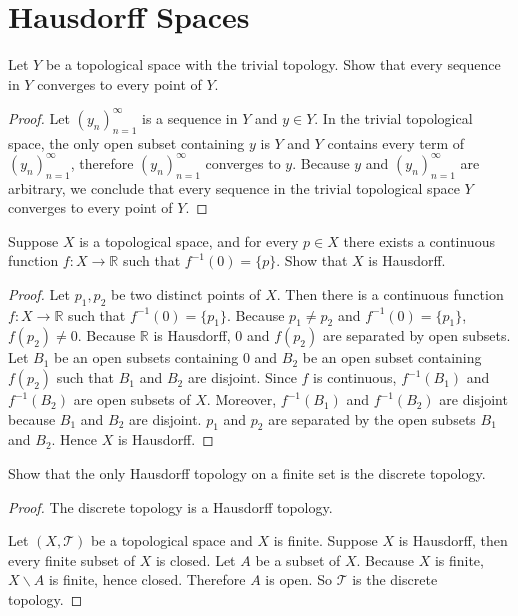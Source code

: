 \section*{Hausdorff Spaces}

\begin{exercise}{2.33}
	Let $Y$ be a topological space with the trivial topology. Show that every sequence in $Y$ converges to every point of $Y$.
\end{exercise}

\begin{proof}
	Let ${(y_{n})}^{\infty}_{n=1}$ is a sequence in $Y$ and $y\in Y$. In the trivial topological space, the only open subset containing $y$ is $Y$ and $Y$ contains every term of ${(y_{n})}^{\infty}_{n=1}$, therefore ${(y_{n})}^{\infty}_{n=1}$ converges to $y$. Because $y$ and ${(y_{n})}^{\infty}_{n=1}$ are arbitrary, we conclude that every sequence in the trivial topological space $Y$ converges to every point of $Y$.
\end{proof}

\begin{exercise}{2.35}
	Suppose $X$ is a topological space, and for every $p\in X$ there exists a continuous function $f: X\to \mathbb{R}$ such that $f^{-1}(0) = \{ p \}$. Show that $X$ is Hausdorff.
\end{exercise}

\begin{proof}
	Let $p_{1}, p_{2}$ be two distinct points of $X$. Then there is a continuous function $f: X\to\mathbb{R}$ such that $f^{-1}(0) = \{ p_{1} \}$. Because $p_{1}\ne p_{2}$ and $f^{-1}(0) = \{ p_{1} \}$, $f(p_{2})\ne 0$. Because $\mathbb{R}$ is Hausdorff, $0$ and $f(p_{2})$ are separated by open subsets. Let $B_{1}$ be an open subsets containing $0$ and $B_{2}$ be an open subset containing $f(p_{2})$ such that $B_{1}$ and $B_{2}$ are disjoint. Since $f$ is continuous, $f^{-1}(B_{1})$ and $f^{-1}(B_{2})$ are open subsets of $X$. Moreover, $f^{-1}(B_{1})$ and $f^{-1}(B_{2})$ are disjoint because $B_{1}$ and $B_{2}$ are disjoint. $p_{1}$ and $p_{2}$ are separated by the open subsets $B_{1}$ and $B_{2}$. Hence $X$ is Hausdorff.
\end{proof}

\begin{exercise}{2.38}
	Show that the only Hausdorff topology on a finite set is the discrete topology.
\end{exercise}

\begin{proof}
	The discrete topology is a Hausdorff topology.

	Let $(X, \mathscr{T})$ be a topological space and $X$ is finite. Suppose $X$ is Hausdorff, then every finite subset of $X$ is closed. Let $A$ be a subset of $X$. Because $X$ is finite, $X\smallsetminus A$ is finite, hence closed. Therefore $A$ is open. So $\mathscr{T}$ is the discrete topology.
\end{proof}

